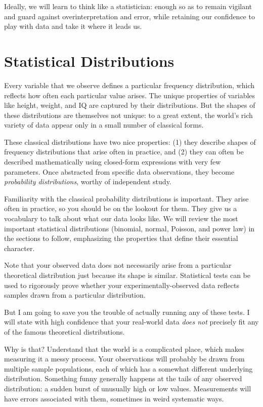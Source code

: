 \documentclass[10pt]{article}
\begin{document}
Ideally, we will learn to think like a statistician: enough so as to remain vigilant and guard against overinterpretation and error, while retaining our confidence to play with data and take it where it leads us.

\section{Statistical Distributions}
Every variable that we observe defines a particular frequency distribution, which reflects how often each particular value arises. The unique properties of variables like height, weight, and IQ are captured by their distributions. But the shapes of these distributions are themselves not unique: to a great extent, the world's rich variety of data appear only in a small number of classical forms.

These classical distributions have two nice properties: (1) they describe shapes of frequency distributions that arise often in practice, and (2) they can often be described mathematically using closed-form expressions with very few parameters. Once abstracted from specific data observations, they become \textit{probability distributions}, worthy of independent study.

Familiarity with the classical probability distributions is important. They arise often in practice, so you should be on the lookout for them. They give us a vocabulary to talk about what our data looks like. We will review the most important statistical distributions (binomial, normal, Poisson, and power law) in the sections to follow, emphasizing the properties that define their essential character.

Note that your observed data does not necessarily arise from a particular theoretical distribution just because its shape is similar. Statistical tests can be used to rigorously prove whether your experimentally-observed data reflects samples drawn from a particular distribution.

But I am going to save you the trouble of actually running any of these tests. I will state with high confidence that your real-world data \textit{does not} precisely fit any of the famous theoretical distributions.

Why is that? Understand that the world is a complicated place, which makes measuring it a messy process. Your observations will probably be drawn from multiple sample populations, each of which has a somewhat different underlying distribution. Something funny generally happens at the tails of any observed distribution: a sudden burst of unusually high or low values. Measurements will have errors associated with them, sometimes in weird systematic ways.
\end{document}
